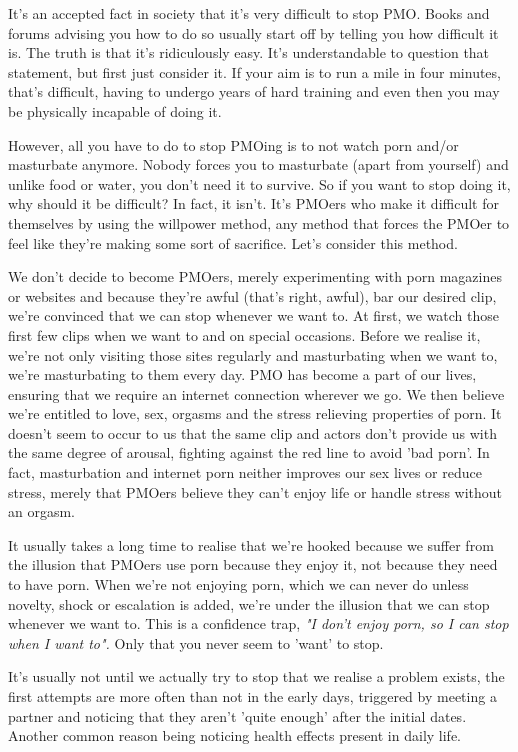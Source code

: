 \documentclass[easypeasy.tex]{subfiles}
\begin{document}
It's an accepted fact in society that it's very difficult to stop PMO. Books and forums advising you how to do so usually start off by telling you how difficult it is. The truth is that it's ridiculously easy. It's understandable to question that statement, but first just consider it. If your aim is to run a mile in four minutes, that's difficult, having to undergo years of hard training and even then you may be physically incapable of doing it.

However, all you have to do to stop PMOing is to not watch porn and/or masturbate anymore. Nobody forces you to masturbate (apart from yourself) and unlike food or water, you don't need it to survive. So if you want to stop doing it, why should it be difficult? In fact, it isn't. It's PMOers who make it difficult for themselves by using the willpower method, any method that forces the PMOer to feel like they're making some sort of sacrifice. Let's consider this method.

We don't decide to become PMOers, merely experimenting with porn magazines or websites and because they're awful (that's right, awful), bar our desired clip, we're convinced that we can stop whenever we want to. At first, we watch those first few clips when we want to and on special occasions. Before we realise it, we're not only visiting those sites regularly and masturbating when we want to, we're masturbating to them every day. PMO has become a part of our lives, ensuring that we require an internet connection wherever we go. We then believe we're entitled to love, sex, orgasms and the stress relieving properties of porn. It doesn't seem to occur to us that the same clip and actors don't provide us with the same degree of arousal, fighting against the red line to avoid 'bad porn'. In fact, masturbation and internet porn neither improves our sex lives or reduce stress, merely that PMOers believe they can't enjoy life or handle stress without an orgasm.

It usually takes a long time to realise that we're hooked because we suffer from the illusion that PMOers use porn because they enjoy it, not because they need to have porn. When we're not enjoying porn, which we can never do unless novelty, shock or escalation is added, we're under the illusion that we can stop whenever we want to. This is a confidence trap, \textit{"I don't enjoy porn, so I can stop when I want to".} Only that you never seem to 'want' to stop.

It's usually not until we actually try to stop that we realise a problem exists, the first attempts are more often than not in the early days, triggered by meeting a partner and noticing that they aren't 'quite enough' after the initial dates. Another common reason being noticing health effects present in daily life.
\end{document}

